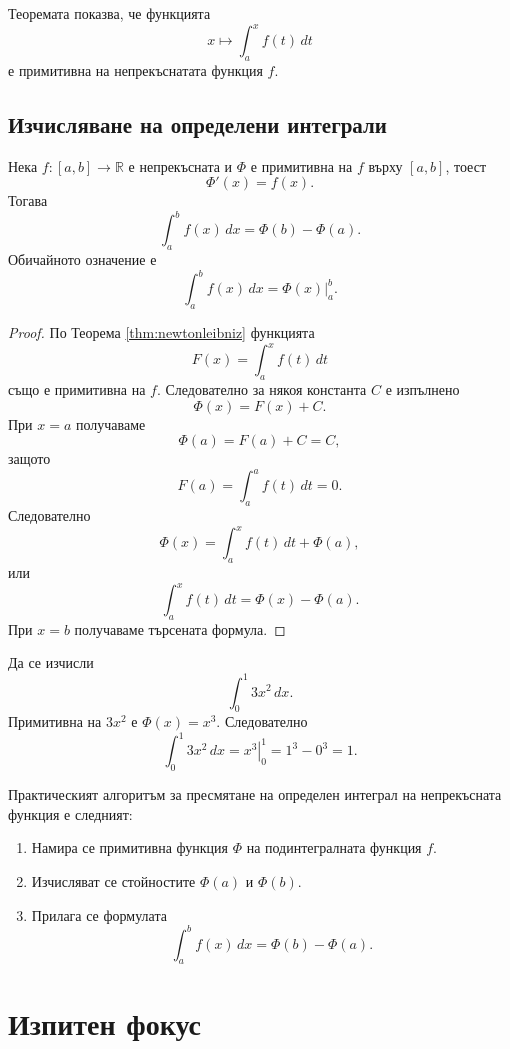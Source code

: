 Теоремата показва, че функцията
\[
x\longmapsto\int_a^x f(t)\,dt
\]
е примитивна на непрекъснатата функция $f$.

\subsection{Изчисляване на определени интеграли}\label{s:33.6.1}

\begin{cor}
Нека $f\colon[a,b]\to\mathbb{R}$ е непрекъсната и $\Phi$ е примитивна на $f$ върху $[a,b]$, тоест
\[
\Phi'(x)=f(x).
\]
Тогава
\[
\int_a^b f(x)\,dx=\Phi(b)-\Phi(a).
\]
Обичайното означение е
\[
\int_a^b f(x)\,dx=\left.\Phi(x)\right|_a^b.
\]
\end{cor}

\begin{proof}
По Теорема \ref{thm:newtonleibniz} функцията
\[
F(x)=\int_a^x f(t)\,dt
\]
също е примитивна на $f$. Следователно за някоя константа $C$ е изпълнено
\[
\Phi(x)=F(x)+C.
\]
При $x=a$ получаваме
\[
\Phi(a)=F(a)+C=C,
\]
защото
\[
F(a)=\int_a^a f(t)\,dt=0.
\]
Следователно
\[
\Phi(x)=\int_a^x f(t)\,dt+\Phi(a),
\]
или
\[
\int_a^x f(t)\,dt=\Phi(x)-\Phi(a).
\]
При $x=b$ получаваме търсената формула.
\end{proof}

\begin{example}
Да се изчисли
\[
\int_0^1 3x^2\,dx.
\]
Примитивна на $3x^2$ е $\Phi(x)=x^3$. Следователно
\[
\int_0^1 3x^2\,dx
=
\left.x^3\right|_0^1
=
1^3-0^3
=
1.
\]
\end{example}

Практическият алгоритъм за пресмятане на определен интеграл на непрекъсната функция е следният:

\begin{enumerate}
\item Намира се примитивна функция $\Phi$ на подинтегралната функция $f$.
\item Изчисляват се стойностите $\Phi(a)$ и $\Phi(b)$.
\item Прилага се формулата
\[
\int_a^b f(x)\,dx=\Phi(b)-\Phi(a).
\]
\end{enumerate}

\section{Изпитен фокус}\label{s:33.7}


